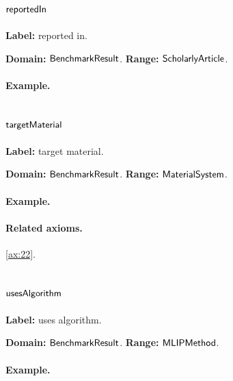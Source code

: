 \subsection{$\mathsf{reportedIn}$}
\label{sec:term-reportedIn}

\textbf{Label:} reported in.

\textbf{Domain:} $\mathsf{BenchmarkResult}$.
\textbf{Range:} $\mathsf{ScholarlyArticle}$.

\paragraph{Example.}

\subsection{$\mathsf{targetMaterial}$}
\label{sec:term-targetMaterial}

\textbf{Label:} target material.

\textbf{Domain:} $\mathsf{BenchmarkResult}$.
\textbf{Range:} $\mathsf{MaterialSystem}$.

\paragraph{Example.}

\paragraph{Related axioms.} \eqref{ax:22}.

\subsection{$\mathsf{usesAlgorithm}$}
\label{sec:term-usesAlgorithm}

\textbf{Label:} uses algorithm.

\textbf{Domain:} $\mathsf{BenchmarkResult}$.
\textbf{Range:} $\mathsf{MLIPMethod}$.

\paragraph{Example.}

